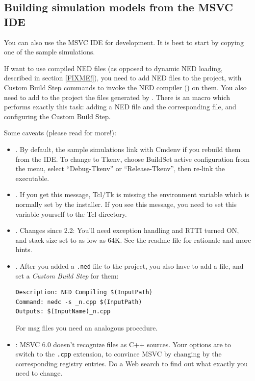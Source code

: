 \subsection{Building simulation models from the MSVC IDE}

You can also use the MSVC IDE for development.
It is best to start by copying one of the sample simulations.

If want to use compiled NED files (as opposed to dynamic
NED loading, described in section \ref{FIXME!}), you need
to add NED files to the project, with Custom Build Step
commands to invoke the NED compiler () on them.
You also need to add to the project the  files
generated by . There is an 
macro which performs exactly this task: adding a NED file and
the corresponding  file, and configuring
the Custom Build Step.


Some caveats (please read  for more!):

\begin{itemize}
 \item {}. By default,
   the sample simulations link with Cmdenv if you rebuild them
   from the IDE. To change to Tkenv, choose Build{\textbar}Set
   active configuration from the menu, select ``Debug-Tkenv''
   or ``Release-Tkenv'', then re-link the executable.

 \item {}. If you get this message,
   Tcl/Tk is missing the  environment variable
   which is normally set by the installer. If you see this message,
   you need to set this variable yourself to the Tcl  directory.

 \item {}. Changes since {\opp} 2.2:
   You'll need exception handling and RTTI turned ON, and
   stack size set to as low as 64K.
   See the readme file for rationale and more hints.

 \item {}. After you added a \texttt{.ned} file
   to the project, you also have to add a  file, and set a
   \textit{Custom Build Step} for them:

\begin{verbatim}
Description: NED Compiling $(InputPath)
Command: nedc -s _n.cpp $(InputPath)
Outputs: $(InputName)_n.cpp
\end{verbatim}

   For msg files you need an analogous procedure.

 \item {}: MSVC 6.0 doesn't recognize  files
   as C++ sources. Your options are to switch to the \texttt{.cpp} extension,
   to convince MSVC by changing by the corresponding registry entries.
   Do a Web search to find out what exactly you need to change.

\end{itemize}


